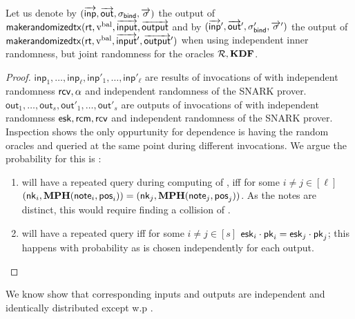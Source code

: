 \documentclass[11pt]{article}
\numberwithin{equation}{section} %
\numberwithin{figure}{section} %
\newcommand{\inp}{\ensuremath{\mathsf{inp}}\xspace}
\newcommand{\inps}{\ensuremath{\overrightarrow{\mathsf{inp}}}\xspace}
\newcommand{\outs}{\ensuremath{\overrightarrow{\mathsf{out}}}\xspace}
\newcommand{\out}{\ensuremath{\mathsf{out}}\xspace}
\begin{document}
Let us denote by $(\inps,\outs,\sigval,\sigs)$ the output of $\mathsf{makerandomizedtx}(\mathsf{rt},\mathrm{v^{bal}},\overrightarrow{\mathsf{input}},\overrightarrow{\mathsf{output}}$
and by $(\inps',\outs',\sigval',\sigs')$ the output of $\mathsf{makerandomizedtx}(\mathsf{rt},\mathrm{v^{bal}},\overrightarrow{\mathsf{input}}',\overrightarrow{\mathsf{output}}')$
when using independent inner randomness, but joint randomness for the oracles $\mathcal R,\mathbf{KDF}$.
\begin{proof}
$\inp_1,\ldots,\inp_\ell,\inp'_1,\ldots,\inp'_\ell$
are results of invocations of \makeinput with independent randomness
$\mathsf{rcv},\alpha$ and independent randomness of the SNARK prover.
$\out_1,\ldots,\out_s,\out'_1,\ldots,\out'_s$ are outputs of invocations of \makerandomizedoutput with
independent randomness $\mathsf{esk},\mathsf{rcm},\mathsf{rcv}$ and independent randomness of the SNARK prover.
Inspection shows the only oppurtunity for dependence is having 
the random oracles \KDF and \RO queried at the same point during different invocations.
We argue the probability for this is \negl:
\begin{enumerate}
 \item \RO will have a repeated query during computing of \nf, iff for some $i\neq j\in [\ell]$ 
 $(\mathsf{nk}_i,\mathbf{MPH}(\mathsf{note}_i,\mathsf{pos}_i)) =(\mathsf{nk}_j,\mathbf{MPH}(\mathsf{note}_j,\mathsf{pos}_j))$.
 As the notes are distinct, this would require finding a collision of \MPH.
 \item \KDF will have a repeated query iff for some $i\neq j \in [s]$
 $\mathsf{esk}_i\cdot \mathsf{pk}_i = \mathsf{esk}_j \cdot \mathsf{pk}_j$; this happens with \negl probability as \esk is chosen independently for
 each output.
\end{enumerate}

\end{proof}

We know show that corresponding inputs and outputs are independent and identically distributed except w.p \negl.
\end{document}
